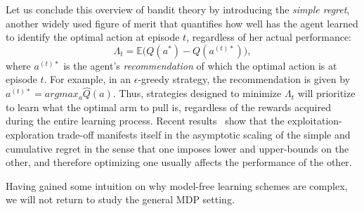 Let us conclude this overview of bandit theory by introducing the \textit{simple regret}, another widely used figure of merit that quantifies how well has the agent learned to identify the optimal action at episode $t$, regardless of her actual performance:
\begin{equation}
\Lambda_t = \mathbb{E} \big(Q(a^{*}) - Q(a^{(t)*}) \big),
\end{equation}
where $a^{(t)*}$ is the agent's \emph{recommendation} of which the optimal action is at episode $t$. For example, in an $\epsilon$-greedy strategy, the recommendation is given by $a^{(t)*}=argmax_{a}\hat{Q}(a)$. Thus, strategies designed to minimize $\Lambda_t$ will prioritize to learn what the optimal arm to pull is, regardless of the rewards acquired during the entire learning process.%
Recent results~\cite{simpleRegretMunoz} show that the exploitation-exploration trade-off manifests itself in the asymptotic scaling of the simple and cumulative regret in the sense that one imposes lower and upper-bounds on the other, and therefore optimizing one usually affects the performance of the other.

Having gained some intuition on why model-free learning schemes are complex, we will not return to study the general MDP setting.
